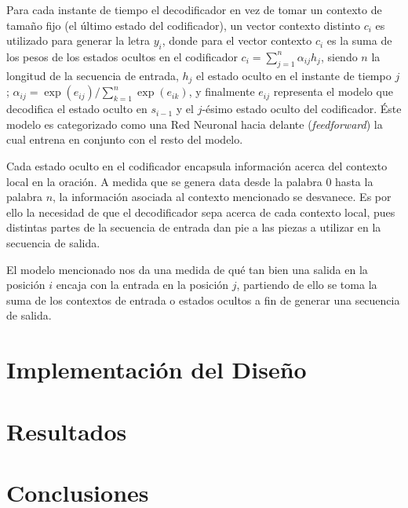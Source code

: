 \documentclass[12pt, letterpaper]{article}
\begin{document}
    Para cada instante de tiempo el decodificador en vez de tomar un contexto de tamaño fijo (el último estado del codificador), un vector contexto distinto $c_i$ es utilizado para generar la letra $y_i$, donde para el vector contexto $c_i$ es la suma de los pesos de los estados ocultos en el codificador $c_i=\sum_{j=1}^{n}\alpha_{ij}h_j$, siendo $n$ la longitud de la secuencia de entrada, $h_j$ el estado oculto en el instante de tiempo $j$; $\alpha_{ij}=\exp(e_{ij})/\sum_{k=1}^n\exp(e_{ik})$, y finalmente $e_{ij}$ representa el modelo que decodifica el estado oculto en $s_{i-1}$ y el $j$-ésimo estado oculto del codificador. Éste modelo es categorizado como una Red Neuronal hacia delante (\emph{feedforward}) la cual entrena en conjunto con el resto del modelo.

    Cada estado oculto en el codificador encapsula información acerca del contexto local en la oración. A medida que se genera data desde la palabra $0$ hasta la palabra $n$, la información asociada al contexto mencionado se desvanece. Es por ello la necesidad de que el decodificador sepa acerca de cada contexto local, pues distintas partes de la secuencia de entrada dan pie a las piezas a utilizar en la secuencia de salida. 

    El modelo mencionado nos da una medida de qué tan bien una salida en la posición $i$ encaja con la entrada en la posición $j$, partiendo de ello se toma la suma de los contextos de entrada o estados ocultos a fin de generar una secuencia de salida.

    \section{Implementación del Diseño}

    \section{Resultados}
    \section{Conclusiones}

    \pagebreak
    \printbibliography[title={Bibliografía}]
\end{document}
